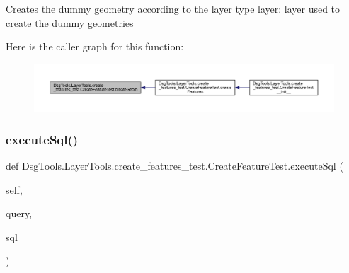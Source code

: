 \begin{DoxyVerb}Creates the dummy geometry according to the layer type
layer: layer used to create the dummy geometries
\end{DoxyVerb}
 Here is the caller graph for this function\+:
\nopagebreak
\begin{figure}[H]
\begin{center}
\leavevmode
\includegraphics[width=350pt]{class_dsg_tools_1_1_layer_tools_1_1create__features__test_1_1_create_feature_test_a4f0ff4286954932c222672f6f34ff96b_icgraph}
\end{center}
\end{figure}
\mbox{\label{class_dsg_tools_1_1_layer_tools_1_1create__features__test_1_1_create_feature_test_a144d062e59edc0d33040b0acb30c2e5b}} 
\subsubsection{\texorpdfstring{execute\+Sql()}{executeSql()}}
{\footnotesize\ttfamily def Dsg\+Tools.\+Layer\+Tools.\+create\+\_\+features\+\_\+test.\+Create\+Feature\+Test.\+execute\+Sql (\begin{DoxyParamCaption}\item[{}]{self,  }\item[{}]{query,  }\item[{}]{sql }\end{DoxyParamCaption})}

